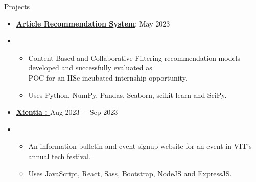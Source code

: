 \documentclass{resume}
\begin{document}
\begin{rSection}{Projects}
\begin{itemize}[label=\null, leftmargin=*, parsep=0.5em]
            \item {
                  \textbf{\href{https://github.com/AdwayB/aiaceszt-Article-Recommendation}{\underline{Article Recommendation System}}}: \hfill May 2023
                  } \\
            \item {
                  \vspace{-1.2\baselineskip}
                  \begin{itemize}[label=$\bullet$]
                        \vspace{-\parskip}
                        \vspace{-\parsep}
                        \item {
                              Content-Based and Collaborative-Filtering recommendation models developed and successfully evaluated as \\
                              POC for an IISc incubated internship opportunity.
                              }
                        \item {
                              Uses Python, NumPy, Pandas, Seaborn, scikit-learn and SciPy.
                              }
                  \end{itemize}
                  }


            \item {
                  \textbf{\href{https://github.com/SIGMA-XI-VIT/Xientia2023}{\underline{Xientia} : }}\hfill Aug 2023 $-$ Sep 2023
                  } \\
            \item {
                  \vspace{-1.2\baselineskip}
                  \begin{itemize}[label=$\bullet$]
                        \vspace{-\parskip}
                        \vspace{-\parsep}
                        \item {
                              An information bulletin and event signup website for an event in VIT’s annual tech festival.
                              }
                        \item {
                              Uses JavaScript, React, Sass, Bootstrap, NodeJS and ExpressJS.\@
                              }
                  \end{itemize}
                  }
      \end{itemize}
\end{rSection}
\end{document}
